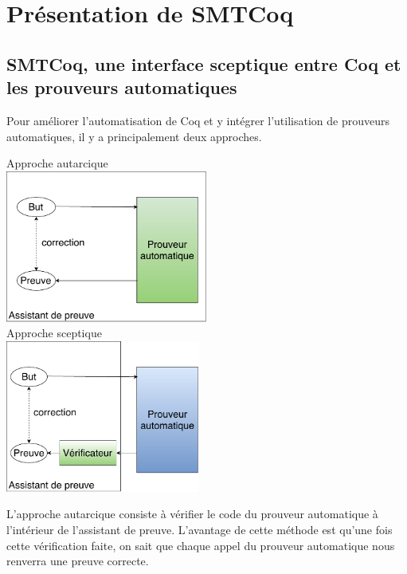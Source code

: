 \documentclass[11pt]{article}
\begin{document}
\newpage
\section{Présentation de SMTCoq}

\subsection{SMTCoq, une interface sceptique entre Coq et les prouveurs automatiques}\label{sceptique_autarcique}

Pour améliorer l'automatisation de Coq et y intégrer l'utilisation de prouveurs automatiques, il y a principalement deux approches.

\begin{multicols}{2}
\begin{center}
Approche autarcique\\
\includegraphics[height=5cm]{1_Autarcique.pdf}\\
Approche sceptique\\
\includegraphics[height=5cm]{2_Sceptique.pdf}\\

\end{center}
\end{multicols}

L'approche autarcique consiste à vérifier le code du prouveur automatique à l'intérieur de l'assistant de preuve. L'avantage de cette méthode est qu'une fois cette vérification faite, on sait que chaque appel du prouveur automatique nous renverra une preuve correcte. \\
\end{document}
